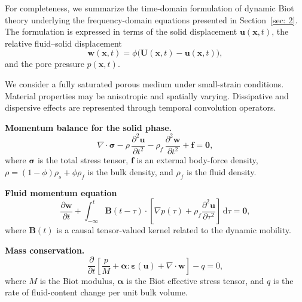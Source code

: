 \documentclass[pdflatex,sn-mathphys-num]{sn-jnl}
\theoremstyle{thmstyleone}%
\theoremstyle{thmstyletwo}%
\theoremstyle{thmstylethree}%
\theoremstyle{definition}
\begin{document}
	For completeness, we summarize the time-domain formulation of dynamic Biot theory
	underlying the frequency-domain equations presented in Section~\ref{sec: 2}. The
	formulation is expressed in terms of the solid displacement $\mathbf{u}(\mathbf{x},t)$,
	the relative fluid--solid displacement
	\[
	\mathbf{w}(\mathbf{x},t) = \phi\big(\mathbf{U}(\mathbf{x},t)-\mathbf{u}(\mathbf{x},t)\big),
	\]
	and the pore pressure $p(\mathbf{x},t)$.
	
	We consider a fully saturated porous medium under small-strain conditions. Material
	properties may be anisotropic and spatially varying. Dissipative and dispersive
	effects are represented through temporal convolution operators.
	
	\medskip
	
	\noindent
	\textbf{Momentum balance for the solid phase.}
	\begin{equation}
		\nabla \cdot \boldsymbol{\sigma}
		- \rho\,\frac{\partial^2 \mathbf{u}}{\partial t^2}
		- \rho_f\,\frac{\partial^2 \mathbf{w}}{\partial t^2}
		+ \mathbf{f}
		= \mathbf{0},
		\label{eq:solid_momentum_time}
	\end{equation}
	where $\boldsymbol{\sigma}$ is the total stress tensor, $\mathbf{f}$ is an external
	body-force density, $\rho = (1-\phi)\rho_s + \phi\rho_f$ is the bulk density, and
	$\rho_f$ is the fluid density.
	
	\medskip
	
	\noindent
	\textbf{Fluid momentum equation}
	\begin{equation}
		\frac{\partial \mathbf{w}}{\partial t}
		+ \int_{-\infty}^{t} \mathbf{B}(t-\tau)
		\cdot
		\left[
		\nabla p(\tau)
		+ \rho_f \frac{\partial^2 \mathbf{u}}{\partial \tau^2}
		\right]
		\,\mathrm{d}\tau
		= \mathbf{0},
		\label{eq:fluid_momentum_time}
	\end{equation}
	where $\mathbf{B}(t)$ is a causal tensor-valued kernel related to the dynamic mobility.
	
	\medskip
	
	\noindent
	\textbf{Mass conservation.}
	\begin{equation}
		\frac{\partial}{\partial t}
		\left[
		\frac{p}{M}
		+ \boldsymbol{\alpha} : \boldsymbol{\varepsilon}(\mathbf{u})
		+ \nabla \cdot \mathbf{w}
		\right]
		- q
		= 0,
		\label{eq:mass_balance_time}
	\end{equation}
	where $M$ is the Biot modulus, $\boldsymbol{\alpha}$ is the Biot effective stress
	tensor, and $q$ is the rate of fluid-content change per unit bulk volume.
	
\end{document}
